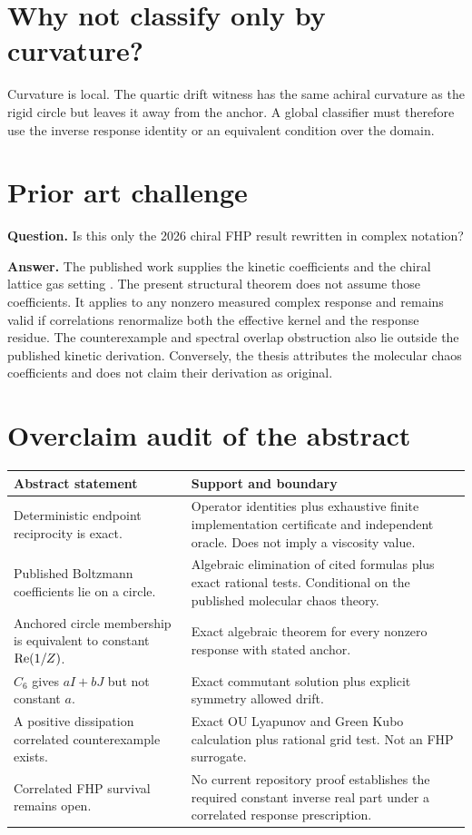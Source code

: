 \section{Why not classify only by curvature?}
Curvature is local. The quartic drift witness has the same achiral curvature as the rigid circle but leaves it away from the anchor. A global classifier must therefore use the inverse response identity or an equivalent condition over the domain.

\section{Prior art challenge}
\textbf{Question.} Is this only the 2026 chiral FHP result rewritten in complex notation?

\textbf{Answer.} The published work supplies the kinetic coefficients and the chiral lattice gas setting \cite{Allocca2026}. The present structural theorem does not assume those coefficients. It applies to any nonzero measured complex response and remains valid if correlations renormalize both the effective kernel and the response residue. The counterexample and spectral overlap obstruction also lie outside the published kinetic derivation. Conversely, the thesis attributes the molecular chaos coefficients and does not claim their derivation as original.

\section{Overclaim audit of the abstract}
\begin{longtable}{p{}p{}}
\toprule
Abstract statement & Support and boundary \\
\midrule
\endhead
Deterministic endpoint reciprocity is exact. & Operator identities plus exhaustive finite implementation certificate and independent oracle. Does not imply a viscosity value.\\
Published Boltzmann coefficients lie on a circle. & Algebraic elimination of cited formulas plus exact rational tests. Conditional on the published molecular chaos theory.\\
Anchored circle membership is equivalent to constant $\operatorname{Re}(1/Z)$. & Exact algebraic theorem for every nonzero response with stated anchor.\\
$C_6$ gives $aI+bJ$ but not constant $a$. & Exact commutant solution plus explicit symmetry allowed drift.\\
A positive dissipation correlated counterexample exists. & Exact OU Lyapunov and Green Kubo calculation plus rational grid test. Not an FHP surrogate.\\
Correlated FHP survival remains open. & No current repository proof establishes the required constant inverse real part under a correlated response prescription.\\
\bottomrule
\end{longtable}

